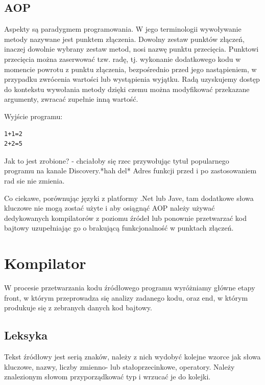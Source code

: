 \documentclass[a4paper,12pt]{article}
\begin{document}
\subsection{AOP}
Aspekty są paradygmem programowania. W jego terminologii wywoływanie metody nazywane jest punktem złączenia. Dowolny zestaw punktów złączeń, inaczej dowolnie wybrany zestaw metod, nosi nazwę punktu przecięcia. Punktowi przecięcia można zaserwować tzw. radę, tj. wykonanie dodatkowego kodu w momencie powrotu z punktu złączenia, bezpośrednio przed jego nastąpieniem, w przypadku zwrócenia wartości lub wystąpienia wyjątku. Radą uzyskujemy dostęp do kontekstu wywołania metody dzięki czemu można modyfikować przekazane argumenty, zwracać zupełnie inną wartość.


Wyjście programu:
\begin{verbatim}
1+1=2
2+2=5
\end{verbatim}

Jak to jest zrobione? - chciałoby się rzec przywołując tytuł popularnego programu na kanale Discovery.*hah del*
Adres funkcji przed i po zastosowaniem rad sie nie zmienia. 

Co ciekawe, porównując języki z platformy .Net lub Jave, tam dodatkowe słowa kluczowe nie mogą zostać użyte i aby osiągnąć AOP należy używać dedykowanych kompilatorów z poziomu źródeł lub ponownie przetwarzać kod bajtowy uzupełniając go o brakującą funkcjonalność w punktach złączeń.

\newpage
\section{Kompilator}
W procesie przetwarzania kodu źródłowego programu wyróżniamy główne etapy front, w którym przeprowadza się analizy zadanego kodu, oraz end, w którym produkuje się z zebranych danych kod bajtowy.

\subsection{Leksyka}
Tekst źródłowy jest serią znaków, należy z nich wydobyć kolejne wzorce jak słowa kluczowe, nazwy, liczby
zmienno- lub stałoprzecinkowe, operatory. Należy znalezionym słowom przyporządkować typ i wrzucać je do kolejki.
\end{document}
